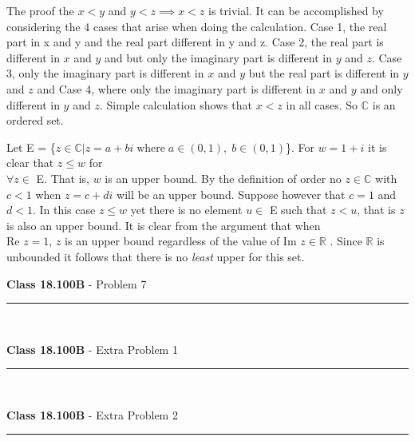 \documentclass[11pt,reqno]{article}
\begin{document}

The proof the $x < y$ and $y < z \implies x < z$ is trivial. It can be accomplished by considering the 4 cases that arise when doing the calculation. Case 1, the real part in x and y and the real part different in y and z. Case 2, the real part is different in $x$ and $y$ and but only the imaginary part is different in $y$ and $z$. Case 3, only the imaginary part is different in $x$ and $y$ but the real part is different in $y$ and $z$ and Case 4, where only the imaginary part is different in $x$ and $y$ and only different in $y$ and $z$. Simple calculation shows that $x < z$ in all cases. So $\mathbb{C}$ is an ordered set. 


Let E = \{$z \in \mathbb{C} | z = a + bi \; \text{where} \; a \in (0,1), \; b \in (0,1) $\}. For $w = 1 + i$ it is clear that $z \le w$ for \\$\forall z \in$ E. That is, $w$ is an upper bound. By the definition of order no $z \in \mathbb{C}$ with $c < 1$ when $z = c + di$ will be an upper bound. Suppose however that $c = 1$ and $d < 1$. In this case $z \le w$ yet there is no element $u \in$ E such that $z < u$, that is $z$ is also an upper bound. It is clear from the argument that when \\Re $z = 1$, $z$ is an upper bound regardless of the value of Im $z \in \mathbb{R}$ . Since $\mathbb{R}$ is unbounded it follows that there is no \textit{least} upper for this set.



\vspace{15pt}
\begin{flushleft} 
\textbf{Class 18.100B} - Problem 7\\
\rule{500pt}{1pt}\\
\end{flushleft} 

\vspace{15pt}
\begin{flushleft} 
\textbf{Class 18.100B} - Extra Problem 1\\
\rule{500pt}{1pt}\\
\end{flushleft} 

\vspace{15pt}
\begin{flushleft} 
\textbf{Class 18.100B} - Extra Problem 2\\
\rule{500pt}{1pt}\\
\end{flushleft} 
\end{document}
